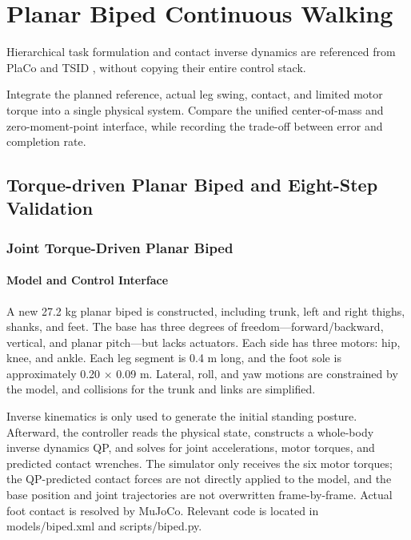 \chapter{Planar Biped Continuous Walking}
Hierarchical task formulation and contact inverse dynamics are referenced from PlaCo \cite{placo} and TSID \cite{tsid}, without copying their entire control stack.


Integrate the planned reference, actual leg swing, contact, and limited motor torque into a single physical system. Compare the unified center-of-mass and zero-moment-point interface, while recording the trade-off between error and completion rate.

\section{Torque-driven Planar Biped and Eight-Step Validation}

\label{stage:s21}

\subsection{Joint Torque-Driven Planar Biped}\label{s21-detail-1}

\subsubsection{Model and Control Interface}\label{s21-detail-2}

A new 27.2 kg planar biped is constructed, including trunk, left and right thighs, shanks, and feet. The base has three degrees of freedom—forward/backward, vertical, and planar pitch—but lacks actuators. Each side has three motors: hip, knee, and ankle. Each leg segment is 0.4 m long, and the foot sole is approximately 0.20 \(\times\) 0.09 m. Lateral, roll, and yaw motions are constrained by the model, and collisions for the trunk and links are simplified.

Inverse kinematics is only used to generate the initial standing posture. Afterward, the controller reads the physical state, constructs a whole-body inverse dynamics QP, and solves for joint accelerations, motor torques, and predicted contact wrenches. The simulator only receives the six motor torques; the QP-predicted contact forces are not directly applied to the model, and the base position and joint trajectories are not overwritten frame-by-frame. Actual foot contact is resolved by MuJoCo. Relevant code is located in models/biped.xml and scripts/biped.py.


